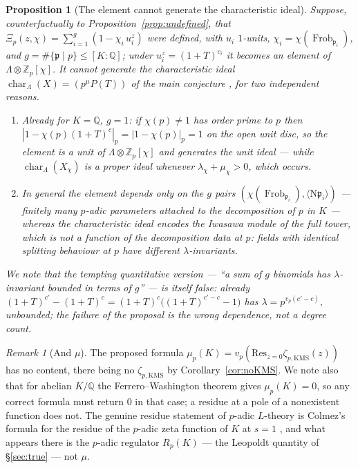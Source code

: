 \documentclass[11pt]{amsart}
\numberwithin{equation}{section}
\newtheorem{proposition}[theorem]{Proposition}
\theoremstyle{definition}
\theoremstyle{remark}
\newtheorem{remark}[theorem]{Remark}
\newcommand{\Z}{\mathbb{Z}}
\newcommand{\Q}{\mathbb{Q}}
\newcommand{\pp}{\mathfrak{p}}
\newcommand{\Ns}{\mathrm{N}}
\newcommand{\Frob}{\operatorname{Frob}}
\newcommand{\chr}{\operatorname{char}}
\begin{document}
\begin{proposition}[The element cannot generate the characteristic ideal]\label{prop:bounded}
Suppose, counterfactually to Proposition~\ref{prop:undefined}, that
$\Xi_p(z,\chi)=\sum_{i=1}^g(1-\chi_i\,u_i^z)$ were defined, with $u_i$ $1$-units,
$\chi_i=\chi(\Frob_{\pp_i})$, and $g=\#\{\pp\mid p\}\le[K:\Q]$; under $u_i^z=(1+T)^{c_i}$ it
becomes an element of $\Lambda\otimes\Z_p[\chi]$. It cannot generate the characteristic
ideal $\chr_\Lambda(X)=(p^{\mu}P(T))$ of the main conjecture \cite{MazurWiles}, for two
independent reasons.
\begin{enumerate}
\item Already for $K=\Q$, $g=1$: if $\chi(p)\ne1$ has order prime to $p$ then
$|1-\chi(p)(1+T)^{c}|_p=|1-\chi(p)|_p=1$ on the open unit disc, so the element is a
\emph{unit} of $\Lambda\otimes\Z_p[\chi]$ and generates the unit ideal --- while
$\chr_\Lambda(X_\chi)$ is a proper ideal whenever $\lambda_\chi+\mu_\chi>0$, which occurs.
\item In general the element depends only on the $g$ pairs
$(\chi(\Frob_{\pp_i}),\langle\Ns\pp_i\rangle)$ --- finitely many $p$-adic parameters
attached to the decomposition of $p$ in $K$ --- whereas the characteristic ideal encodes the
Iwasawa module of the full tower, which is not a function of the decomposition data at $p$:
fields with identical splitting behaviour at $p$ have different $\lambda$-invariants.
\end{enumerate}
We note that the tempting quantitative version --- ``a sum of $g$ binomials has
$\lambda$-invariant bounded in terms of $g$'' --- is itself false: already
$(1+T)^{c'}-(1+T)^{c}=(1+T)^{c}\bigl((1+T)^{c'-c}-1\bigr)$ has
$\lambda=p^{v_p(c'-c)}$, unbounded; the failure of the proposal is the wrong
\emph{dependence}, not a degree count.
\end{proposition}

\begin{remark}[And $\mu$]\label{rem:mu}
The proposed formula $\mu_p(K)=v_p(\mathrm{Res}_{z=0}\zeta_{p,\mathrm{KMS}}(z))$ has no
content, there being no $\zeta_{p,\mathrm{KMS}}$ by Corollary~\ref{cor:noKMS}. We note also
that for abelian $K/\Q$ the Ferrero--Washington theorem \cite{FW} gives $\mu_p(K)=0$, so any
correct
formula must return $0$ in that case; a residue at a pole of a nonexistent function does not.
The genuine residue statement of $p$-adic $L$-theory is Colmez's formula for the residue of
the $p$-adic zeta function of $K$ at $s=1$ \cite{Colmez}, and what appears there is the
$p$-adic regulator $R_p(K)$ --- the Leopoldt quantity of \S\ref{sec:true} --- not $\mu$.
\end{remark}
\end{document}
